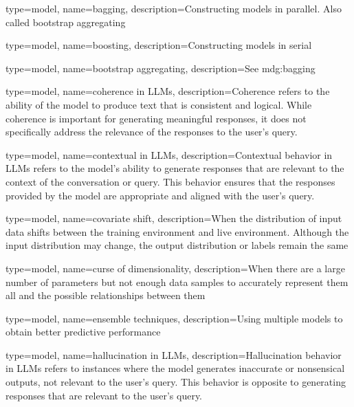 

{
	type=model,
    name=bagging,
    description={Constructing models in parallel.  Also called bootstrap aggregating}
}

{
	type=model,
    name=boosting,
    description={Constructing models in serial}
}

{
	type=model,
    name=bootstrap aggregating,
    description={See \gls{mdg:bagging}}
}

{
	type=model,
    name=coherence in LLMs,
    description={Coherence refers to the ability of the model to produce text that is consistent and logical. While coherence is important for generating meaningful responses, it does not specifically address the relevance of the responses to the user's query.}
}

{
	type=model,
    name=contextual in LLMs,
    description={Contextual behavior in LLMs refers to the model's ability to generate responses that are relevant to the context of the conversation or query. This behavior ensures that the responses provided by the model are appropriate and aligned with the user's query.}
}

{
	type=model,
    name=covariate shift,
    description={When the distribution of input data shifts between the training environment and live environment.  Although the input distribution may change, the output distribution or labels remain the same}
}

{
	type=model,
    name=curse of dimensionality,
    description={When there are a large number of parameters but not enough data samples to accurately represent them all and the possible relationships between them}
}

{
	type=model,
    name=ensemble techniques,
    description={Using multiple models to obtain better predictive performance}
}

{
	type=model,
    name=hallucination in LLMs,
    description={Hallucination behavior in LLMs refers to instances where the model generates inaccurate or nonsensical outputs, not relevant to the user's query. This behavior is opposite to generating responses that are relevant to the user's query.}
}

